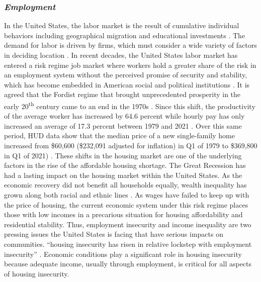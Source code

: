 \subsubsection{\textit{Employment}}

In the United States, the labor market is the result of cumulative individual behaviors including geographical migration and educational investments \citep{wiener_labor_2020}. The demand for labor is driven by firms, which must consider a wide variety of factors in deciding location \citep{partridge_persistent_2007}. In recent decades, the United States labor market has entered a risk regime job market where workers hold a greater share of the risk in an employment system without the perceived promise of security and stability, which has become embedded in American social and political institutions \citep{lowe_perceived_2018}. It is agreed that the Fordist regime that brought unprecedented prosperity in the early 20\textsuperscript{th} century came to an end in the 1970s \citep{stockhammer_stylized_2008}. Since this shift, the productivity of the average worker has increased by 64.6 percent while hourly pay has only increased an average of 17.3 percent between 1979 and 2021 \citep{productivity-pay-gap_2022}. Over this same period, HUD data show that the median price of a new single-family home increased from \$60,600 (\$232,091 adjusted for inflation) in Q1 of 1979 to \$369,800 in Q1 of 2021) \citep{us_census_bureau_median_1963}. These shifts in the housing market are one of the underlying factors in the rise of the affordable housing shortage. The Great Recession has had a lasting impact on the housing market within the United States. As the economic recovery did not benefit all households equally, wealth inequality has grown along both racial and ethnic lines \citep{kochhar_wealth_2014}. As wages have failed to keep up with the price of housing, the current economic system under this risk regime places those with low incomes in a precarious situation for housing affordability and residential stability. Thus, employment insecurity and income inequality are two pressing issues the United States is facing that have serious impacts on communities. “housing insecurity has risen in relative lockstep with employment insecurity” \citep[48]{desmond_housing_2016-1}. Economic conditions play a significant role in housing insecurity because adequate income, usually through employment, is critical for all aspects of housing insecurity. 


